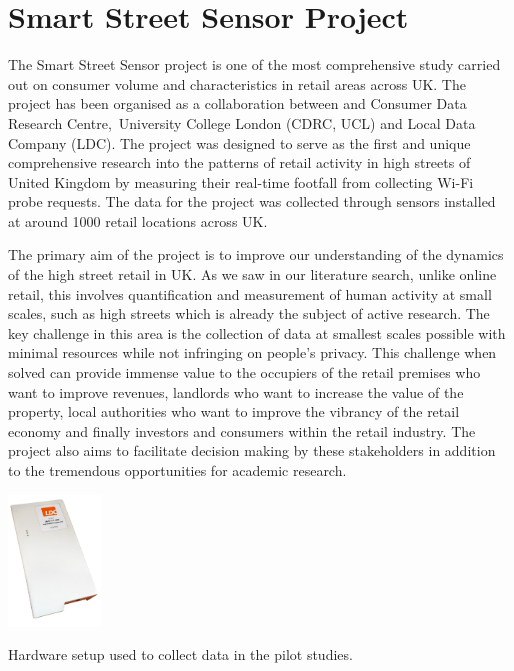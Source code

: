 \section{Smart Street Sensor Project}
The Smart Street Sensor project is one of the most comprehensive study carried out on consumer volume and characteristics in retail areas across UK.
The project has been organised as a collaboration between and Consumer Data Research Centre, University College London (CDRC, UCL) and Local Data Company (LDC).
The project was designed to serve as the first and unique comprehensive research into the patterns of retail activity in high streets of United Kingdom by measuring their real-time footfall from collecting Wi-Fi probe requests.
The data for the project was collected through sensors installed at around 1000 retail locations across UK.

The primary aim of the project is to improve our understanding of the dynamics of the high street retail in UK.
As we saw in our literature search, unlike online retail, this involves quantification and measurement of human activity at small scales, such as high streets which is already the subject of active research.
The key challenge in this area is the collection of data at smallest scales possible with minimal resources while not infringing on people’s privacy.
This challenge when solved can provide immense value to the occupiers of the retail premises who want to improve revenues, landlords who want to increase the value of the property, local authorities who want to improve the vibrancy of the retail economy and finally investors and consumers within the retail industry.
The project also aims to facilitate decision making by these stakeholders in addition to the tremendous opportunities for academic research.

\begin{marginfigure}[-2cm]
  \centering
  \includegraphics[height=3.5cm]{images/sss-hardware.jpg}
  \caption{Hardware setup used to collect data in the pilot studies.}
  \label{figure:collection:sss:hardware}
\end{marginfigure}

